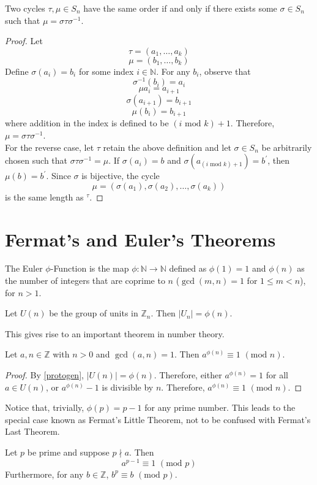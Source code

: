 \documentclass[12pt, letterpaper]{report}
\begin{document}
\begin{theorem}
	Two cycles \(\tau ,\mu \in S_n\) have the same order if and only if there exists some \(\sigma \in S_n\) such that \(\mu =\sigma \tau \sigma ^{-1} \).
\end{theorem}
\begin{proof}
	Let
	\[
		\tau =\left( a_1,\ldots,a_k \right) 
	\]
	\[
		\mu =\left( b_1,\ldots,b_k \right) 
	\]
	Define \(\sigma (a_i)=b_i\) for some index \(i\in\mathbb{N}\). For any \(b_{i} \), observe that 
	\[
		\sigma ^{-1} (b_i)=a_i
	\]
	\[
		\mu a_i = a_{i+1} 
	\]
	\[
		\sigma (a_{i+1} )=b_{i+1} 
	\]
	\[
		\mu (b_i)=b_{i+1} 
	\]
	where addition in the index is defined to be \((i\,\,\text{mod }k )+1\). Therefore, \(\mu =\sigma \tau \sigma ^{-1} \).\\
	For the reverse case, let \(\tau \) retain the above definition and let \(\sigma \in S_n\) be arbitrarily chosen such that \(\sigma \tau \sigma ^{-1} =\mu \). If \(\sigma (a_i)=b\) and \(\sigma \left( a_{(i\,\,\text{mod }k )+1} \right)=b^{\prime}  \), then \(\mu (b)=b^{\prime} \). Since \(\sigma \) is bijective, the cycle 
	\[
		\mu =\left( \sigma (a_1),\sigma (a_2),\ldots,\sigma (a_k) \right) 
	\]
	is the same length as \(^\tau \).
\end{proof}
\section{Fermat's and Euler's Theorems}
The Euler \(\phi \)-Function is the map \(\phi :\mathbb{N}\to \mathbb{N}\) defined as \(\phi (1)=1\) and \(\phi (n)\) as the number of integers that are coprime to \(n\) (\(\operatorname{gcd}(m,n)=1 \) for \(1\leq m<n\)), for \(n>1\).
\begin{theorem}\label{protogen}
	Let \(U(n)\) be the group of units in \(\mathbb{Z}_n\). Then \(\vert U_n \vert =\phi (n)\).
\end{theorem}
This gives rise to an important theorem in number theory.
\begin{theorem}
	Let \(a,n\in\mathbb{Z}\) with \(n>0\) and \(\operatorname{gcd}(a,n)=1 \). Then \(a^{\phi (n)} \equiv 1\,\,(\text{mod }n )\).
\end{theorem}
\begin{proof}
	By \ref{protogen}, \(\vert U(n) \vert=\phi (n) \). Therefore, either \(a^{\phi (n)}=1\) for all \(a\in U(n)\), or \(a^{\phi (n)}-1\) is divisible by \(n\). Therefore, \(a^{\phi (n)} \equiv 1\,\,(\text{mod }n )\).
\end{proof}
Notice that, trivially, \(\phi (p)=p-1\) for any prime number. This leads to the special case known as Fermat's Little Theorem, not to be confused with Fermat's Last Theorem.
\begin{theorem}
	Let \(p\) be prime and suppose \(p\nmid a\). Then 
	\[
		a^{p-1}\equiv 1\,\,(\text{mod } p)
	\]
	Furthermore, for any \(b\in\mathbb{Z}\), \(b^p \equiv b\,\,(\text{mod }p )\).
\end{theorem}
\end{document}
